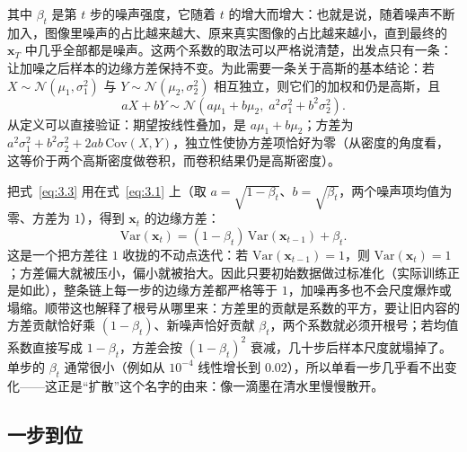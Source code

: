 \documentclass[UTF8,a4paper,12pt]{ctexart}
\numberwithin{equation}{section}
\begin{document}
其中 $\beta_t$ 是第 $t$ 步的噪声强度，它随着 $t$ 的增大而增大：也就是说，随着噪声不断加入，图像里噪声的占比越来越大、原来真实图像的占比越来越小，直到最终的 $\bm{x}_T$ 中几乎全部都是噪声。这两个系数的取法可以严格说清楚，出发点只有一条：让加噪之后样本的边缘方差保持不变。为此需要一条关于高斯的基本结论：若 $X\sim\mathcal{N}(\mu_1,\sigma_1^2)$ 与 $Y\sim\mathcal{N}(\mu_2,\sigma_2^2)$ 相互独立，则它们的加权和仍是高斯，且
\begin{equation}\label{eq:3.3}
aX+bY\sim\mathcal{N}\!\left(a\mu_1+b\mu_2,\;a^2\sigma_1^2+b^2\sigma_2^2\right).
\end{equation}
从定义可以直接验证：期望按线性叠加，是 $a\mu_1+b\mu_2$；方差为 $a^2\sigma_1^2+b^2\sigma_2^2+2ab\,\mathrm{Cov}(X,Y)$，独立性使协方差项恰好为零（从密度的角度看，这等价于两个高斯密度做卷积，而卷积结果仍是高斯密度）。

把式~\eqref{eq:3.3} 用在式~\eqref{eq:3.1} 上（取 $a=\sqrt{1-\beta_t}$、$b=\sqrt{\beta_t}$，两个噪声项均值为零、方差为 $1$），得到 $\bm{x}_t$ 的边缘方差：
\begin{equation}\label{eq:3.4}
\mathrm{Var}(\bm{x}_t)=(1-\beta_t)\,\mathrm{Var}(\bm{x}_{t-1})+\beta_t .
\end{equation}
这是一个把方差往 $1$ 收拢的不动点迭代：若 $\mathrm{Var}(\bm{x}_{t-1})=1$，则 $\mathrm{Var}(\bm{x}_t)=1$；方差偏大就被压小，偏小就被抬大。因此只要初始数据做过标准化（实际训练正是如此），整条链上每一步的边缘方差都严格等于 $1$，加噪再多也不会尺度爆炸或塌缩。顺带这也解释了根号从哪里来：方差里的贡献是系数的平方，要让旧内容的方差贡献恰好乘 $(1-\beta_t)$、新噪声恰好贡献 $\beta_t$，两个系数就必须开根号；若均值系数直接写成 $1-\beta_t$，方差会按 $(1-\beta_t)^2$ 衰减，几十步后样本尺度就塌掉了。单步的 $\beta_t$ 通常很小（例如从 $10^{-4}$ 线性增长到 $0.02$），所以单看一步几乎看不出变化——这正是“扩散”这个名字的由来：像一滴墨在清水里慢慢散开。

\subsection{一步到位}
\end{document}
